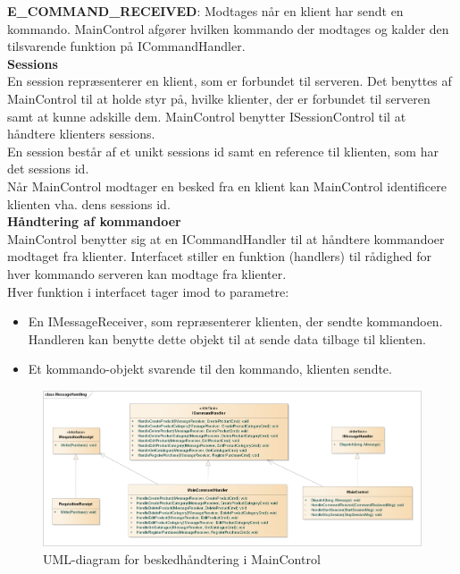 \textbf{E\_COMMAND\_RECEIVED}:
Modtages når en klient har sendt en kommando. MainControl afgører hvilken kommando der modtages og kalder den tilsvarende funktion på ICommandHandler.\\


\textbf{Sessions}\\
En session repræsenterer en klient, som er forbundet til serveren. Det benyttes af MainControl til at holde styr på, hvilke klienter, der er forbundet til serveren samt at kunne adskille dem. MainControl benytter ISessionControl til at håndtere klienters sessions.\\

En session består af et unikt sessions id samt en reference til klienten, som har det sessions id.\\

Når MainControl modtager en besked fra en klient kan MainControl identificere klienten vha. dens sessions id.\\


\textbf{Håndtering af kommandoer}\\
MainControl benytter sig at en ICommandHandler til at håndtere kommandoer modtaget fra klienter. Interfacet stiller en funktion (handlers) til rådighed for hver kommando serveren kan modtage fra klienter.\\

Hver funktion i interfacet tager imod to parametre:

\begin{itemize}
  \item En IMessageReceiver, som repræsenterer klienten, der sendte kommandoen. Handleren kan benytte dette objekt til at sende data tilbage til klienten. 
  \item Et kommando-objekt svarende til den kommando, klienten sendte.
\end{itemize}



\begin{figure}[H]
    \centering
    \includegraphics[width=1\textwidth]{Systemdesign/CentralServer/Images/BeskedHaandtering.png}
    \caption{UML-diagram for beskedhåndtering i MainControl}
    \label{fig:CSBeskedHaandtering}
\end{figure}

